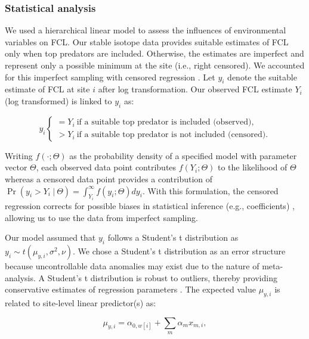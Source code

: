 \documentclass[11pt, class=article, crop=false]{standalone}
\begin{document}
\subsubsection{Statistical analysis}

We used a hierarchical linear model to assess the influences of environmental variables on FCL.
Our stable isotope data provides suitable estimates of FCL only when top predators are included.
Otherwise, the estimates are imperfect and represent only a possible minimum at the site (i.e., right censored).
We accounted for this imperfect sampling with censored regression \citep{terui_stream_2018, lunn_bugs_2012}.
Let $y_i$ denote the suitable estimate of FCL at site $i$ after log transformation.
Our observed FCL estimate $Y_i$ (log transformed) is linked to $y_i$ as:

\begin{equation}
    y_i 
    \begin{cases}
        = Y_i~\text{if a suitable top predator is included (observed)},\\
        > Y_i~\text{if a suitable top predator is not included (censored).}
    \end{cases}
\end{equation}

Writing $f(\cdot;\Theta)$ as the probability density of a specified model with parameter vector $\Theta$, each observed data point contributes $f(Y_i;\Theta)$ to the likelihood of $\Theta$ whereas a censored data point provides a contribution of $\Pr(y_i > Y_i~|~\Theta) = \int_{Y_i}^{\infty} f(y_i;\Theta) dy_i$.
With this formulation, the censored regression corrects for possible biases in statistical inference (e.g., coefficients) \citep{terui_stream_2018, lunn_bugs_2012}, allowing us to use the data from imperfect sampling.

Our model assumed that $y_i$ follows a Student's t distribution as $y_i \sim t(\mu_{y,i}, \sigma^2, \nu)$.
We chose a Student's t distribution as an error structure because uncontrollable data anomalies may exist due to the nature of meta-analysis.
A Student's t distribution is robust to outliers, thereby providing conservative estimates of regression parameters \citep{lunn_bugs_2012}.
The expected value $\mu_{y,i}$ is related to site-level linear predictor(s) as:

\begin{equation}
    \mu_{y,i} = \alpha_{0, w[i]} + \sum_m \alpha_m x_{m,i},
\end{equation}
\end{document}
